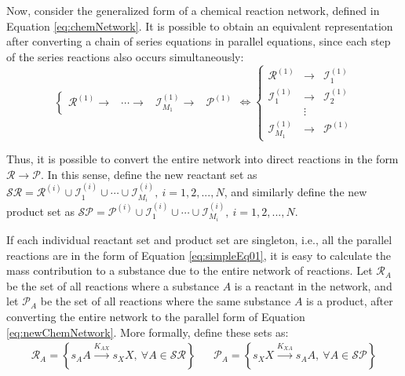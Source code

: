 \documentclass[a4paper,11pt]{book}
\numberwithin{figure}{chapter}
\numberwithin{equation}{chapter}
\numberwithin{table}{chapter}
\theoremstyle{definition}
\begin{document}
Now, consider the generalized form of a chemical reaction network, defined in Equation \eqref{eq:chemNetwork}. It is possible to obtain an equivalent representation after converting a chain of series equations in parallel equations, since each step of the series reactions also occurs simultaneously:
\begin{equation} \label{eq:newChemNetwork}
\left\{ \begin{matrix}
    \mathcal{R}^{(1)}  \longrightarrow & \cdots \longrightarrow & \mathcal{I}^{(1)}_{M_1} \longrightarrow & \mathcal{P}^{(1)}
\end{matrix} \right. \Longleftrightarrow \left\{ \begin{matrix}
    \mathcal{R}^{(1)}  & \longrightarrow & \mathcal{I}^{(1)}_1  \\ 
    \mathcal{I}^{(1)}_1 & \longrightarrow & \mathcal{I}^{(1)}_2 \\
	 & \vdots & \\
	\mathcal{I}^{(1)}_{M_1} & \longrightarrow & \mathcal{P}^{(1)}
\end{matrix} \right.
\end{equation} 

Thus, it is possible to convert the entire network into direct reactions in the form $\mathcal{R} \rightarrow \mathcal{P}$. In this sense, define the new reactant set as $\mathcal{SR} = \mathcal{R}^{(i)} \cup \mathcal{I}_1^{(i)} \cup \cdots \cup \mathcal{I}_{M_i}^{(i)},\ i = 1,2,...,N$, and similarly define the new product set as $\mathcal{SP} = \mathcal{P}^{(i)} \cup \mathcal{I}_1^{(i)} \cup \cdots \cup \mathcal{I}_{M_i}^{(i)},\ i = 1,2,...,N$. 

If each individual reactant set and product set are singleton, i.e., all the parallel reactions are in the form of Equation \eqref{eq:simpleEq01}, it is easy to calculate the mass contribution to a substance due to the entire network of reactions. Let $\mathcal{R}_A$ be the set of all reactions where a substance $A$ is a reactant in the network, and let $\mathcal{P}_A$ be the set of all reactions where the same substance $A$ is a product, after converting the entire network to the parallel form of Equation \eqref{eq:newChemNetwork}. More formally, define these sets as: 
\begin{equation}
	\begin{matrix}
		\mathcal{R}_A = \left\{ s_A A \overset{K_{AX}}{\rightarrow} s_X X,\ \forall A \in \mathcal{SR} \right\} & & \mathcal{P}_A = \left\{ s_X X \overset{K_{XA}}{\rightarrow} s_A A,\ \forall A \in \mathcal{SP} \right\}
	\end{matrix}
\end{equation}
\end{document}
